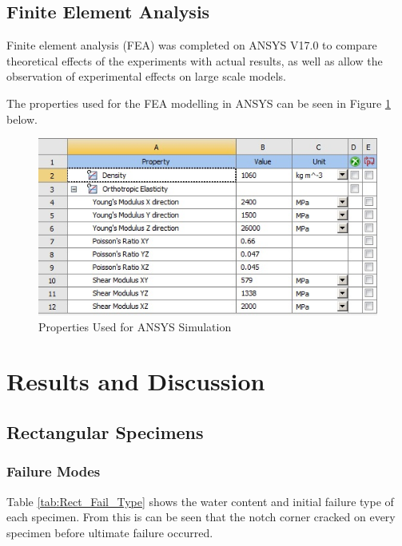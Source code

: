 \documentclass[11pt,a4paper]{article}
\numberwithin{equation}{subsection}
\begin{document}
\subsection{Finite Element Analysis}
Finite element analysis (FEA) was completed on ANSYS V17.0 to compare theoretical effects of the experiments with actual results, as well as allow the observation of experimental effects on large scale models. 

\vspace*{\baselineskip}

\noindent
The properties used for the FEA modelling in ANSYS can  be seen in Figure \ref{fig:Properties} below.
\begin{figure}[h]
	\begin{center}
		\includegraphics[scale=0.8]{Ansys_Properties}
	\end{center}
	\caption{Properties Used for ANSYS Simulation}
	\label{fig:Properties}
\end{figure}
\pagebreak
\vspace*{\baselineskip}
\pagebreak

\section{Results and Discussion}

\subsection{Rectangular Specimens}
\subsubsection{Failure Modes}
Table \ref{tab:Rect_Fail_Type} shows the water content and initial failure type of each specimen. From this is can be seen that the notch corner cracked on every specimen before ultimate failure occurred.
\end{document}

